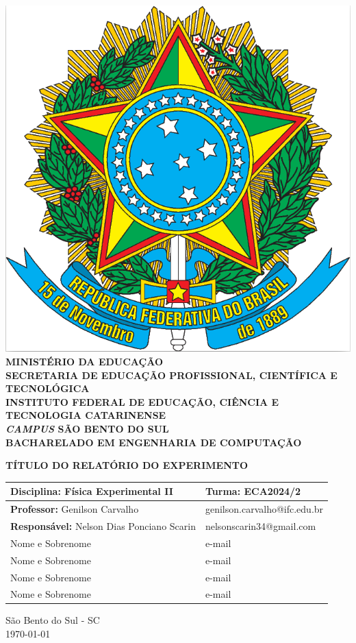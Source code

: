 \documentclass[a4paper, 12pt]{article}
\begin{document}

\begin{center}
	\includegraphics[scale=0.08]{./pictures/brasao.png}\\
{\footnotesize {\bf MINISTÉRIO DA EDUCAÇÃO\\
	SECRETARIA DE EDUCAÇÃO PROFISSIONAL, CIENTÍFICA E TECNOLÓGICA\\
	INSTITUTO FEDERAL DE EDUCAÇÃO, CIÊNCIA E TECNOLOGIA CATARINENSE\\
	\textit{CAMPUS} SÃO BENTO DO SUL\\
	BACHARELADO EM ENGENHARIA DE COMPUTAÇÃO}}

\vspace{5cm}
\textbf{TÍTULO DO RELATÓRIO DO EXPERIMENTO}

\vspace{3cm}
\begin{tabular}{|l|l|}
\hline
{\bf Disciplina:} Física Experimental II & {\bf Turma:} ECA2024/2 \\ \hline
{\bf Professor:} Genilson Carvalho & genilson.carvalho@ifc.edu.br \\ \hline
{\bf Responsável:} Nelson Dias Ponciano Scarin & nelsonscarin34@gmail.com \\ \hline
Nome e Sobrenome & e-mail \\ \hline
Nome e Sobrenome & e-mail \\ \hline
Nome e Sobrenome & e-mail \\ \hline
Nome e Sobrenome & e-mail \\ \hline
\end{tabular}

\vspace{7cm}
São Bento do Sul - SC\\
\today
\end{center}
\newpage	
\end{document}
